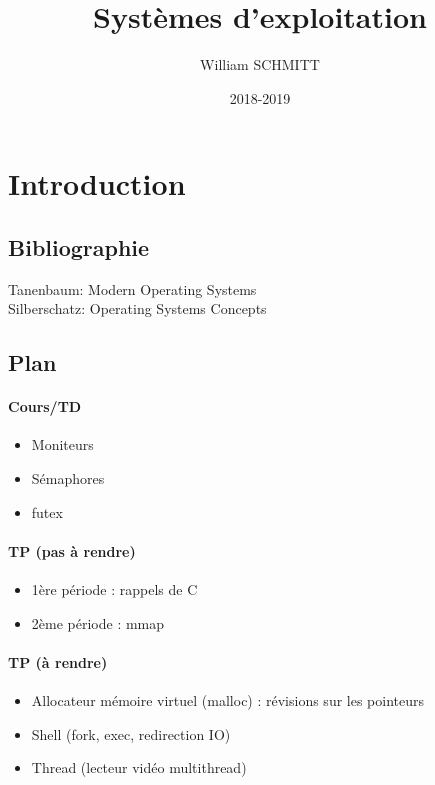 \documentclass[11pt]{article}
\title{Systèmes d'exploitation}
\author{William SCHMITT}
\date{2018-2019}
\begin{document}
\maketitle

\section{Introduction}
\subsection{Bibliographie}

Tanenbaum: Modern Operating Systems \\
Silberschatz: Operating Systems Concepts

\subsection{Plan}

\paragraph{Cours/TD}
\begin{itemize}
    \item Moniteurs
    \item Sémaphores
    \item futex
\end{itemize}

\paragraph{TP (pas à rendre)}
\begin{itemize}
    \item 1ère période : rappels de C
    \item 2ème période : mmap
\end{itemize}

\paragraph{TP (à rendre)}
\begin{itemize}
    \item Allocateur mémoire virtuel (malloc) : révisions sur les pointeurs
    \item Shell (fork, exec, redirection IO)
    \item Thread (lecteur vidéo multithread)
\end{itemize}
\end{document}
